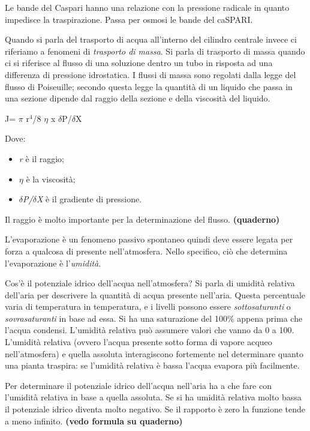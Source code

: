 \documentclass[]{article}
\begin{document}
Le bande del Caspari hanno una relazione con la pressione radicale in
quanto impedisce la traspirazione. Passa per osmosi le bande del
caSPARI.

Quando si parla del trasporto di acqua all'interno del cilindro centrale
invece ci riferiamo a fenomeni di \emph{trasporto di massa}. Si parla di
trasporto di massa quando ci si riferisce al flusso di una soluzione
dentro un tubo in risposta ad una differenza di pressione idrostatica. I
flussi di massa sono regolati dalla legge del flusso di Poiseuille;
secondo questa legge la quantità di un liquido che passa in una sezione
dipende dal raggio della sezione e della viscosità del liquido.

J= $\pi$ r$^4$/8 $\eta$ x $\delta$P/$\delta$X

Dove:

\begin{itemize}
\itemsep1pt\parskip0pt
\item
  \emph{r} è il raggio;
\item
  \emph{$\eta$} è la viscosità;
\item
  \emph{$\delta$P/$\delta$X} è il gradiente di pressione.
\end{itemize}

Il raggio è molto importante per la determinazione del flusso.
\textbf{(quaderno)}

L'evaporazione è un fenomeno passivo spontaneo quindi deve essere legata
per forza a qualcosa di presente nell'atmosfera. Nello specifico, ciò
che determina l'evaporazione è l'\emph{umidità}.

Cos'è il potenziale idrico dell'acqua nell'atmosfera? Si parla di
umidità relativa dell'aria per descrivere la quantità di acqua presente
nell'aria. Questa percentuale varia di temperatura in temperatura, e i
livelli possono essere \emph{sottosaturanti} o \emph{sovrasaturanti} in
base ad essa. Si ha una saturazione del 100\% appena prima che l'acqua
condensi. L'umidità relativa può assumere valori che vanno da 0 a 100.
L'umidità relativa (ovvero l'acqua presente sotto forma di vapore acqueo
nell'atmosfera) e quella assoluta interagiscono fortemente nel
determinare quanto una pianta traspira: se l'umidità relativa è bassa
l'acqua evapora più facilmente.

Per determinare il potenziale idrico dell'acqua nell'aria ha a che fare
con l'umidità relativa in base a quella assoluta. Se si ha umidità
relativa molto bassa il potenziale idrico diventa molto negativo. Se il
rapporto è zero la funzione tende a meno infinito. \textbf{(vedo formula
su quaderno)}
\end{document}
